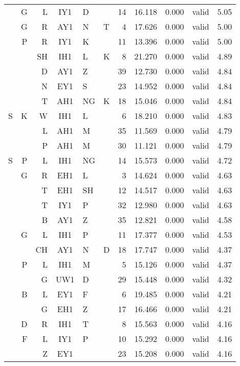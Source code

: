 \documentclass[12pt]{article}
\begin{document}
\begin{longtable}{r@{ }r@{ }r@{ }c@{ }l@{ }l@{ } rrrrr}
  &  G &  L & IY1 & D  &    & 14 & 16.118 & 0.000 &   valid & 5.05 \\
  &  G &  R & AY1 & N  & T  &  4 & 17.626 & 0.000 &   valid & 5.00 \\
  &  P &  R & IY1 & K  &    & 11 & 13.396 & 0.000 &   valid & 5.00 \\
  &    & SH & IH1 & L  & K  &  8 & 21.270 & 0.000 &   valid & 4.89 \\
  &    &  D & AY1 & Z  &    & 39 & 12.730 & 0.000 &   valid & 4.84 \\
  &    &  N & EY1 & S  &    & 23 & 14.952 & 0.000 &   valid & 4.84 \\
  &    &  T & AH1 & NG & K  & 18 & 15.046 & 0.000 &   valid & 4.84 \\
S &  K &  W & IH1 & L  &    &  6 & 18.210 & 0.000 &   valid & 4.83 \\
  &    &  L & AH1 & M  &    & 35 & 11.569 & 0.000 &   valid & 4.79 \\
  &    &  P & AH1 & M  &    & 30 & 11.121 & 0.000 &   valid & 4.79 \\
S &  P &  L & IH1 & NG &    & 14 & 15.573 & 0.000 &   valid & 4.72 \\
  &  G &  R & EH1 & L  &    &  3 & 14.624 & 0.000 &   valid & 4.63 \\
  &    &  T & EH1 & SH &    & 12 & 14.517 & 0.000 &   valid & 4.63 \\
  &    &  T & IY1 & P  &    & 32 & 12.980 & 0.000 &   valid & 4.63 \\
  &    &  B & AY1 & Z  &    & 35 & 12.821 & 0.000 &   valid & 4.58 \\
  &  G &  L & IH1 & P  &    & 11 & 17.377 & 0.000 &   valid & 4.53 \\
  &    & CH & AY1 & N  & D  & 18 & 17.747 & 0.000 &   valid & 4.37 \\
  &  P &  L & IH1 & M  &    &  5 & 15.126 & 0.000 &   valid & 4.37 \\
  &    &  G & UW1 & D  &    & 29 & 15.448 & 0.000 &   valid & 4.32 \\
  &  B &  L & EY1 & F  &    &  6 & 19.485 & 0.000 &   valid & 4.21 \\
  &    &  G & EH1 & Z  &    & 17 & 16.466 & 0.000 &   valid & 4.21 \\
  &  D &  R & IH1 & T  &    &  8 & 15.563 & 0.000 &   valid & 4.16 \\
  &  F &  L & IY1 & P  &    & 10 & 15.292 & 0.000 &   valid & 4.16 \\
  &    &  Z & EY1 &    &    & 23 & 15.208 & 0.000 &   valid & 4.16 \\

\end{longtable}
\end{document}
